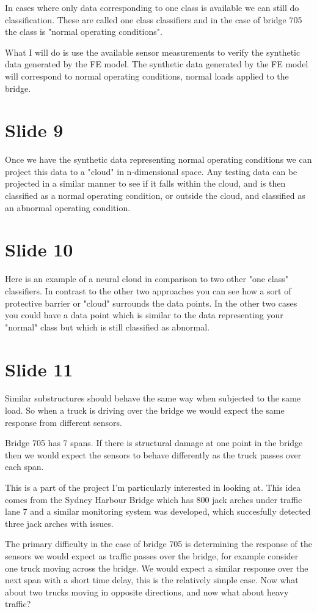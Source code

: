 \documentclass[11pt]{article}
\begin{document}
In cases where only data corresponding to one class is available we can still
do classification. These are called one class classifiers and in the case of
bridge 705 the class is "normal operating conditions".

What I will do is use the available sensor measurements to verify the
synthetic data generated by the FE model. The synthetic data generated by the
FE model will correspond to normal operating conditions, normal loads applied
to the bridge.
\section{Slide 9}
\label{sec:orgdcdda6a}
Once we have the synthetic data representing normal operating conditions we
can project this data to a "cloud" in n-dimensional space. Any testing data
can be projected in a similar manner to see if it falls within the cloud, and
is then classified as a normal operating condition, or outside the cloud, and
classified as an abnormal operating condition.
\section{Slide 10}
\label{sec:orgb1d5310}
Here is an example of a neural cloud in comparison to two other "one class"
classifiers. In contrast to the other two approaches you can see how a sort of
protective barrier or "cloud" surrounds the data points. In the other two
cases you could have a data point which is similar to the data representing
your "normal" class but which is still classified as abnormal.
\section{Slide 11}
\label{sec:org38cb6d3}
Similar substructures should behave the same way when subjected to the same
load. So when a truck is driving over the bridge we would expect the same
response from different sensors.

Bridge 705 has 7 spans. If there is structural damage at one point in the
bridge then we would expect the sensors to behave differently as the truck
passes over each span.

This is a part of the project I'm particularly interested in looking at. This
idea comes from the Sydney Harbour Bridge which has 800 jack arches under
traffic lane 7 and a similar monitoring system was developed, which
succesfully detected three jack arches with issues.

The primary difficulty in the case of bridge 705 is determining the response
of the sensors we would expect as traffic passes over the bridge, for example
consider one truck moving across the bridge. We would expect a similar
response over the next span with a short time delay, this is the relatively
simple case. Now what about two trucks moving in opposite directions, and now
what about heavy traffic?
\end{document}
